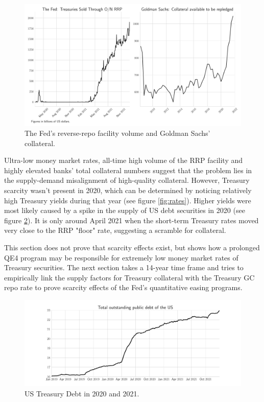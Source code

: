 \documentclass[11pt,a4paper,english,oneside]{article}
\begin{document}
\begin{figure}[htb!]
  \begin{center}
  \caption{The Fed's reverse-repo facility volume and Goldman Sachs' collateral.}
  \label{fig:rrp+coll}
    \includegraphics[width=0.99\linewidth]{rrp+coll.pdf}
  \end{center}
\end{figure}

Ultra-low money market rates, all-time high volume of the RRP facility and highly elevated banks' total collateral numbers suggest that the problem lies in the supply-demand misalignment of high-quality collateral. However, Treasury scarcity wasn't present in 2020, which can be determined by noticing relatively high Treasury yields during that year (see figure \ref{fig:rates}). Higher yields were most likely caused by a spike in the supply of US debt securities in 2020 (see figure \ref{fig:debt}). It is only around April 2021 when the short-term Treasury rates moved very close to the RRP "floor" rate, suggesting a scramble for collateral.

This section does not prove that scarcity effects exist, but shows how a prolonged QE4 program may be responsible for extremely low money market rates of Treasury securities. The next section takes a 14-year time frame and tries to empirically link the supply factors for Treasury collateral with the Treasury GC repo rate to prove scarcity effects of the Fed's quantitative easing programs.

\begin{figure}[htb!]
  \begin{center}
    \caption{US Treasury Debt in 2020 and 2021.}
    \label{fig:debt}
    \includegraphics[width=0.99\linewidth]{debt-2020.pdf}
  \end{center}
\end{figure}
\end{document}
